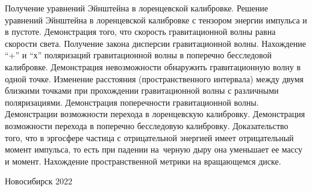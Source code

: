 \documentclass[12pt,pagesize,paper=192mm:108mm,landscape]{scrbook}
\begin{document}
\begin{titlepage}
  \vspace*{-0.5em}
  \begin{center}    

    



     \vfill

     \normalsize
     \begin{minipage}{0.8\linewidth}
       Получение уравнений Эйнштейна в лоренцевской
       калибровке. Решение уравнений Эйнштейна в лоренцевской
       калибровке с тензором энергии импульса и в
       пустоте. Демонстрация того, что скорость гравитационной волны
       равна скорости света. Получение закона дисперсии гравитационной
       волны. Нахождение ``+'' и ``х'' поляризаций гравитационной волны в
       поперечно бесследовой калибровке. Демонстрация невозможности
       обнаружить гравитационную волну в одной точке. Изменение
       расстояния (пространственного интервала) между двумя близкими
       точками при прохождении гравитационной волны с различными
       поляризациями. Демонстрация поперечности гравитационной
       волны. Демонстрации возможности перехода в лоренцевскую
       калибровку. Демонстрация возможности перехода в поперечно
       бесследовую калибровку. Доказательство того, что в эргосфере
       частица с отрицательной энергией имеет отрицательный момент
       импульса, то есть при падении на~черную дыру она уменьшает ее
       массу и момент. Нахождение пространственной метрики на
       вращающемся диске.
     \end{minipage}
    \vfill

    \normalsize \ccbysa\hspace{0.5em}  Новосибирск 2022
  \end{center}
\end{titlepage}
\end{document}
